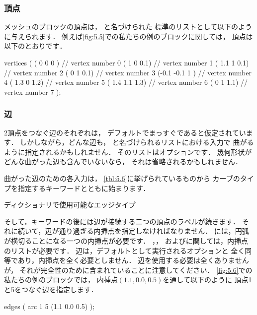 \subsubsection{頂点}
\label{sssec:5.3.1.1}
メッシュのブロックの頂点は，
と名づけられた
標準のリストとして以下のように与えられます．
例えば\autoref{fig:5.5}での私たちの例のブロックに関しては，
頂点は以下のとおりです．
\begin{OFverbatim}[file]
vertices
(
( 0 0 0 ) // vertex number 0
( 1 0 0.1) // vertex number 1
( 1.1 1 0.1) // vertex number 2
( 0 1 0.1) // vertex number 3
(-0.1 -0.1 1 ) // vertex number 4
( 1.3 0 1.2) // vertex number 5
( 1.4 1.1 1.3) // vertex number 6
( 0 1 1.1) // vertex number 7
);
\end{OFverbatim}

\subsubsection{辺}
\label{sssec:5.3.1.2}
2頂点をつなぐ辺のそれぞれは，
デフォルトでまっすぐであると仮定されています．
しかしながら，どんな辺も，
と名づけられるリストにおける入力で
曲がるように指定されるかもしれません．
そのリストはオプションです．
幾何形状がどんな曲がった辺も含んでいないなら，
それは省略されるかもしれません．

曲がった辺のための各入力は，
\autoref{tbl:5.6}に挙げられているものから
カーブのタイプを指定するキーワードとともに始まります．


\begin{table}[ht]
 
 \caption{ディクショナリで使用可能なエッジタイプ}
 \label{tbl:5.6}
\end{table}


そして，キーワードの後には辺が接続する二つの頂点のラベルが続きます．
それに続いて，辺が通り過ぎる内挿点を指定しなければなりません．
には，円弧が横切ることになる一つの内挿点が必要です．
，，
およびに関しては，内挿点のリストが必要です．
辺は，デフォルトとして実行されるオプションと
全く同等であり，内挿点を全く必要としません．
辺を使用する必要は全くありませんが，
それが完全性のために含まれていることに注意してください．
\autoref{fig:5.6}での私たちの例のブロックでは，
内挿点$(1.1, 0.0, 0.5)$を通して以下のように
頂点1と5をつなぐ辺を指定します．
\begin{OFverbatim}[file]
edges
(
arc 1 5 (1.1 0.0 0.5)
);
\end{OFverbatim}

